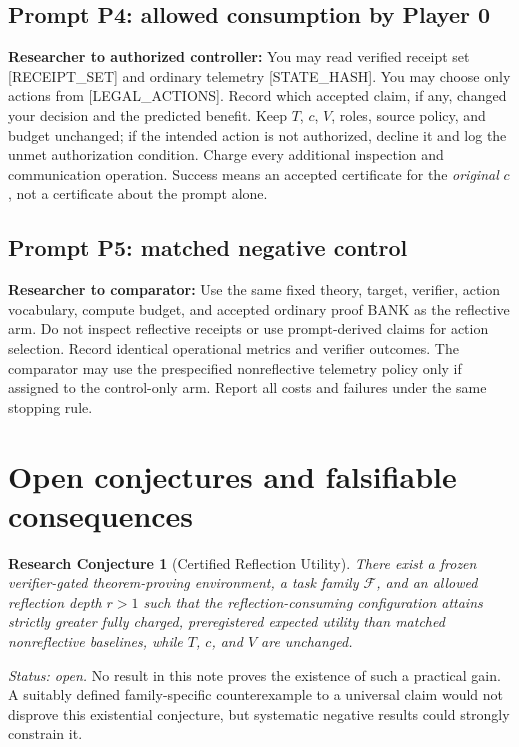 \documentclass[11pt,letterpaper]{article}
\newtheorem{conjecture}[definition]{Research Conjecture}
\begin{document}
\subsection{Prompt P4: allowed consumption by Player 0}
\begin{researchprompt}
\textbf{Researcher to authorized controller:} You may read verified receipt set [RECEIPT\_SET] and ordinary telemetry [STATE\_HASH]. You may choose only actions from [LEGAL\_ACTIONS]. Record which accepted claim, if any, changed your decision and the predicted benefit. Keep $T$, $c$, $V$, roles, source policy, and budget unchanged; if the intended action is not authorized, decline it and log the unmet authorization condition. Charge every additional inspection and communication operation. Success means an accepted certificate for the \emph{original} $c$, not a certificate about the prompt alone.
\end{researchprompt}

\subsection{Prompt P5: matched negative control}
\begin{researchprompt}
\textbf{Researcher to comparator:} Use the same fixed theory, target, verifier, action vocabulary, compute budget, and accepted ordinary proof BANK as the reflective arm. Do not inspect reflective receipts or use prompt-derived claims for action selection. Record identical operational metrics and verifier outcomes. The comparator may use the prespecified nonreflective telemetry policy only if assigned to the control-only arm. Report all costs and failures under the same stopping rule.
\end{researchprompt}

\section{Open conjectures and falsifiable consequences}
\begin{conjecture}[Certified Reflection Utility]\label{conj:utility}
There exist a frozen verifier-gated theorem-proving environment, a task family $\mathcal F$, and an allowed reflection depth $r>1$ such that the reflection-consuming configuration attains strictly greater \emph{fully charged, preregistered} expected utility than matched nonreflective baselines, while $T$, $c$, and $V$ are unchanged.
\end{conjecture}
\emph{Status: open.} No result in this note proves the existence of such a practical gain. A suitably defined family-specific counterexample to a universal claim would not disprove this existential conjecture, but systematic negative results could strongly constrain it.
\end{document}
